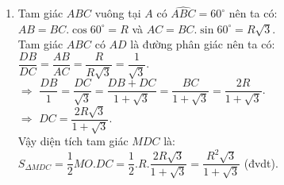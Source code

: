 \begin{ex}
{\begin{enumerate}
        		Mà $AM$ là tia phân giác của $\widehat{BAC}$ nên $\widehat{MAC}=45^\circ$.\\
        		$\Rightarrow$ Tam giác $AED$ vuông cân tại $E$ $\Rightarrow$ $ED=ED$.\\
        		Vậy tứ giác $AEDF$ là hình vuông.
        \item Tam giác $ABC$ vuông tại $A$ có $\widehat{ABC}=60^\circ$ nên ta có:\\
       			 \hspace*{0.5cm} $AB=BC.\cos 60^\circ=R$ và $AC=BC.\sin 60^\circ=R\sqrt{3}$.\\
       			 Tam giác $ABC$ có $AD$ là đường phân giác nên ta có: $\dfrac{DB}{DC}=\dfrac{AB}{AC}=\dfrac{R}{R\sqrt{3}}=\dfrac{1}{\sqrt{3}}$.\\
       			 $\Rightarrow$ $\dfrac{DB}{1}=\dfrac{DC}{\sqrt{3}}=\dfrac{DB+DC}{1+\sqrt{3}}=\dfrac{BC}{1+\sqrt{3}}=\dfrac{2R}{1+\sqrt{3}}$.\\
       			 $\Rightarrow$ $DC=\dfrac{2R\sqrt{3}}{1+\sqrt{3}}$.\\
       			 Vậy diện tích tam giác $MDC$ là: $S_{\Delta MDC}=\dfrac{1}{2}MO.DC=\dfrac{1}{2}.R.\dfrac{2R\sqrt{3}}{1+\sqrt{3}}=\dfrac{R^2\sqrt{3}}{1+\sqrt{3}}$ (đvdt).
    \end{enumerate}
    }
\end{ex}


